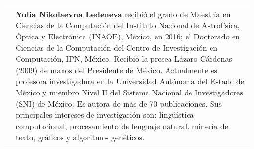 \documentclass[letterpaper,10pt,final,hyphenatedtitles]{papertexKS}
\begin{document}
\begin{tabular}{p{}p{}}
\begin{minipage}[tc]{0.86\columnwidth}
	\end{minipage}
	\\
	\begin{minipage}[tc]{0.1\columnwidth}
		\image{images/authors/yulialedeneva.png}{}
	\end{minipage} &
	\begin{minipage}[tc]{0.86\columnwidth}
		\textcolor{color}{\textbf{Yulia Nikolaevna Ledeneva}} recibió el grado de Maestría en Ciencias de la Computación del Instituto Nacional de Astrofísica, Óptica y Electrónica (INAOE), México, en 2016; el Doctorado en Ciencias de la Computación del Centro de Investigación en Computación, IPN, México. Recibió la presea Lázaro Cárdenas (2009) de manos del Presidente de México. Actualmente es profesora investigadora en la Universidad Autónoma del Estado de México y miembro Nivel II del Sistema Nacional de Investigadores (SNI) de México. Es autora de más de 70 publicaciones. Sus principales intereses de investigación son: lingüística computacional, procesamiento de lenguaje natural, minería de texto, gráficos y algoritmos genéticos. 
	\end{minipage}
\end{tabular}
\newssep
\end{document}

